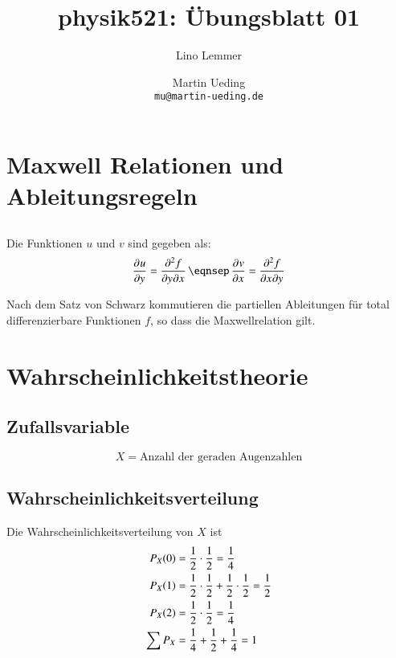 

\setcounter{section}{1}
\renewcommand\thesection{H\,1.\arabic{section}}
\renewcommand\thesubsection{\thesection.\alph{subsection}}

\title{physik521: Übungsblatt 01}
\author{Lino Lemmer \and Martin Ueding \\ \small{\texttt{mu@martin-ueding.de}}}


\maketitle
\section{Maxwell Relationen und Ableitungsregeln}

\subsection{}

Die Funktionen $u$ und $v$ sind gegeben als:
\[
    \dpd uy = \dmd f2y{}x{}
    \eqnsep
    \dpd vx = \dmd f2x{}y{}
\]

Nach dem Satz von Schwarz kommutieren die partiellen Ableitungen für total differenzierbare Funktionen $f$, so dass die Maxwellrelation gilt.


\section{Wahrscheinlichkeitstheorie}

\subsection{Zufallsvariable}

\[
    X = \text{Anzahl der geraden Augenzahlen}
\]

\subsection{Wahrscheinlichkeitsverteilung}

Die Wahrscheinlichkeitsverteilung von $X$ ist
\begin{align*}
    P_X(0) &= \frac 12\cdot\frac 12 = \frac 14\\
    P_X(1) &= \frac 12\cdot\frac 12 + \frac 12\cdot\frac 12 = \frac 12\\
    P_X(2) &= \frac 12\cdot\frac 12 = \frac 14\\
    \sum P_X &= \frac 14 + \frac 12 + \frac 14 = 1
\end{align*}

